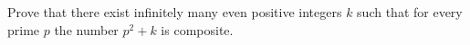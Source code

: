 Prove that there exist infinitely many even positive integers $k$ such that for every prime $p$ the number $p^2+k$ is composite.